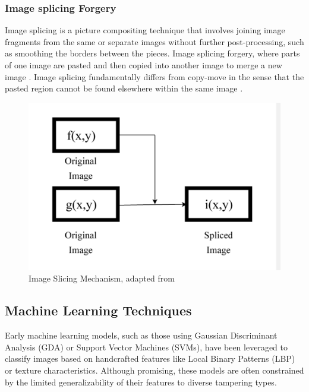 \documentclass{ieeeaccess}
\begin{document}
 \subsubsection{Image splicing Forgery} 
 Image splicing is a picture compositing technique that involves joining image fragments from the same or separate images without further post-processing, such as smoothing the borders between the pieces. Image splicing forgery, where parts of one image are pasted and then copied into another image to merge a new image \cite{8456113}. Image splicing fundamentally differs from copy-move in the sense that the pasted region cannot be found elsewhere within the same image \cite{8631389}.
 
 \begin{figure}[h!]
 	\centering
 	\begin{minipage}{0.45\textwidth}
 		\centering
 		\includegraphics[width=\linewidth]{Slicing_Image.png}
 	\end{minipage}
 	\caption{Image Slicing Mechanism, adapted from \cite{8631389}}
 	\label{Slicing Image Mechanism}
 \end{figure}

\subsection{Machine Learning Techniques}
Early machine learning models, such as those using Gaussian Discriminant Analysis (GDA) or Support Vector Machines (SVMs), have been leveraged to classify images based on handcrafted features like Local Binary Patterns (LBP) or texture characteristics. Although promising, these models are often constrained by the limited generalizability of their features to diverse tampering types.
\end{document}
